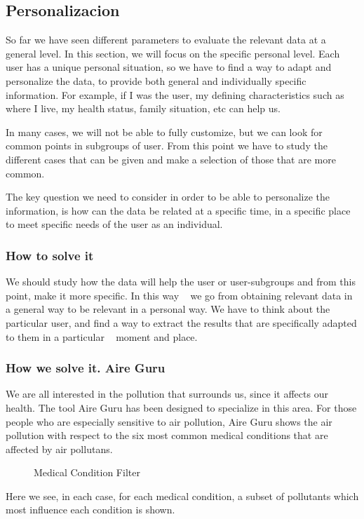 \subsection{Personalizacion}
So far we have seen different parameters to evaluate the relevant data at a general level. In this section, we will focus on the specific personal level.
Each user has a unique personal situation, so we have to find a way to adapt and personalize the data, to provide both general and individually specific information.
For example, if I was the user, my defining characteristics such as where I live,
my health status, family situation, etc can help us.

In many cases, we will not be able to fully customize, but we can look for common points in subgroups of
user. From this point we have to study the different cases that can be given and make a selection of those that are
more common.

The key question we need to consider in order to be able to personalize the information, is how can the data be related at a specific time, in a specific place to meet specific needs of the
user as an individual.

\subsubsection{How to solve it} 

We should study how the data will help the user or user-subgroups and from this point, make it more specific. In this way
  we go from obtaining relevant data in a general way to be relevant in a personal way. We have to think about the
  particular user, and find a way to extract the results that are specifically adapted to them in a particular
  moment and place.

\subsubsection{How we solve it. Aire Guru} 
 We are all interested in the pollution that surrounds us, since it affects our health. The tool
 Aire Guru has been designed to specialize in this area. For those people who are especially sensitive to air pollution, Aire Guru shows the air pollution with respect to the six most common medical conditions that
 are affected by air pollutans.
 

\begin{figure}[ht]
    \centering
    \hfill
    \hfill
  
  \caption{Medical Condition Filter}
    \end{figure}
  Here we see, in each case, for each medical condition, a subset of pollutants which most influence each condition is shown.
    
